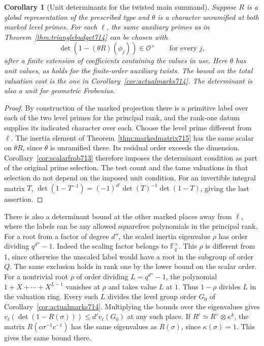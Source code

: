 \documentclass[a4paper,11pt]{article}
\newtheorem{corollary}[proposition]{Corollary}
\theoremstyle{definition}
\theoremstyle{remark}
\numberwithin{equation}{section}
\begin{document}
\begin{corollary}[Unit determinants for the twisted main summand]
\leavevmode\label{cor:markeddet715}
Suppose \(R\) is a global representation of the prescribed
type and \(\theta\) is a character unramified at both marked
level primes. For each \(\ell\), the same auxiliary primes as
in Theorem~\ref{thm:trianglebudget714} can be chosen with
\[
            \det(1-(\theta R)(\phi_j))\in\mathcal O^\times
                 \qquad\text{for every }j ,
\]
after a finite extension of coefficients containing the values
in use. Here \(\theta\) has unit values, as holds for the
finite-order auxiliary twists. The bound on the total
valuation cost is the one in Corollary~\ref{cor:actualmarks714}.
The determinant is also a unit for geometric Frobenius.
\end{corollary}
\begin{proof}
By construction of the marked projection there is a primitive
label over each of the two level primes for the principal
rank, and the rank-one datum supplies its indicated character
over each. Choose the level prime different from \(\ell\).
The inertia element of Theorem~\ref{thm:markedmatrix715}
has the same scalar on \(\theta R\), since \(\theta\) is
unramified there. Its residual order exceeds the dimension.
Corollary~\ref{cor:scalarfrob713} therefore imposes the
determinant condition as part of the original prime selection.
The test count and the tame valuations in that selection do
not depend on the imposed unit condition. For an invertible
integral matrix \(T\),
\(\det(1-T^{-1})=(-1)^{d'}\det(T)^{-1}\det(1-T)\), giving the
last assertion.
\end{proof}

There is also a determinant bound at the other marked places
away from \(\ell\), where the labels can be any allowed
squarefree polynomials in the principal rank. For a root
from a factor of degree \(d''\), the scaled inertia eigenvalue
\(\rho\) has order dividing \(q^{d''}-1\). Indeed the scaling
factor belongs to \(\mathbb F_q^\times\). This \(\rho\) is
different from \(1\), since otherwise the unscaled label
would have a root in the subgroup of order \(Q\).
The same exclusion holds in rank one by the lower bound
on the scalar order. For a nontrivial root \(\rho\) of order
dividing \(L=q^{d''}-1\), the polynomial \(1+X+\cdots+X^{L-1}\)
vanishes at \(\rho\) and takes value \(L\) at \(1\). Thus
\(1-\rho\) divides \(L\) in the valuation ring. Every such
\(L\) divides the level group order \(G_0\) of
Corollary~\ref{cor:actualmarks714}. Multiplying the bounds
over the eigenvalues gives
\(v_\ell(\det(1-R(\sigma)))\le d'v_\ell(G_0)\) at any
such place. If \(R^c\simeq R^\vee\otimes\kappa^k\), the
matrix \(R(c\sigma^{-1}c^{-1})\) has the same eigenvalues
as \(R(\sigma)\), since \(\kappa(\sigma)=1\). This gives the same bound there.
\end{document}
